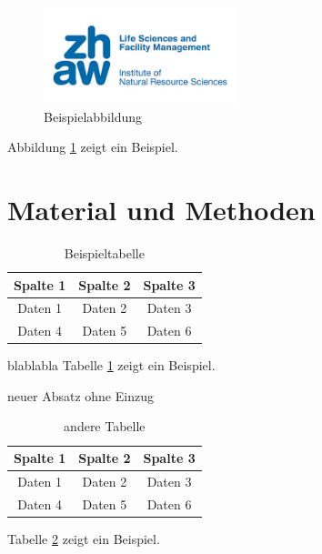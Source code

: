 \documentclass[a4paper,11pt,twoside]{article}
\begin{document}
	\begin{figure}[b] %
		\raggedright %
		\includegraphics[width=0.5\textwidth]{zhaw.jpg} %
		\caption{Beispielabbildung}
		\label{fig:beispiel}
	\end{figure}
	Abbildung \ref{fig:beispiel} zeigt ein Beispiel.
	
	
	\newpage
	\section{Material und Methoden}
	\begin{table}[ht]
		\raggedright
		\caption{Beispieltabelle}
		\begin{tabular}{|c|c|c|}
			\hline
			Spalte 1 & Spalte 2 & Spalte 3 \\ \hline
			Daten 1  & Daten 2  & Daten 3  \\ \hline
			Daten 4  & Daten 5  & Daten 6  \\ \hline
		\end{tabular}
		\label{tab:beispiel}
	\end{table} 
	\noindent %
	blablabla Tabelle \ref{tab:beispiel} zeigt ein Beispiel.
	\\%
	\par\noindent neuer Absatz ohne Einzug
	\begin{table}[ht]
		\centering
		\begin{tabular}{|c|c|c|}
			\hline
			Spalte 1 & Spalte 2 & Spalte 3 \\ \hline
			Daten 1  & Daten 2  & Daten 3  \\ \hline
			Daten 4  & Daten 5  & Daten 6  \\ \hline
		\end{tabular}
		\caption{andere Tabelle}
		\label{tab:andere}
	\end{table}
	\par\noindent  Tabelle \ref{tab:andere} zeigt ein Beispiel.
	
\end{document}
